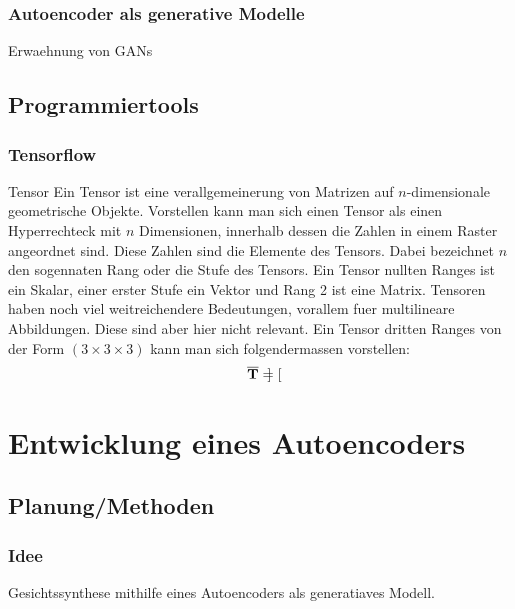 \subsection{Autoencoder als generative Modelle}
Erwaehnung von GANs

\section{Programmiertools}

\subsection{Tensorflow}
\begin{defbox}{Tensor}
  Ein Tensor ist eine verallgemeinerung von Matrizen auf
  $n$-dimensionale geometrische Objekte. Vorstellen kann man sich einen Tensor
  als einen Hyperrechteck mit $n$ Dimensionen, innerhalb dessen die Zahlen in
  einem Raster angeordnet sind. Diese Zahlen sind die Elemente des Tensors.
  Dabei bezeichnet $n$ den sogennaten Rang oder die Stufe des Tensors.
  Ein Tensor nullten Ranges ist ein Skalar, einer erster Stufe ein Vektor und
  Rang 2 ist eine Matrix.
  Tensoren haben noch viel weitreichendere Bedeutungen, vorallem fuer
  multilineare Abbildungen. Diese sind aber hier nicht relevant.
  \para{}
  Ein Tensor dritten Ranges von der Form $(3 \times 3 \times 3)$ kann man sich
  folgendermassen vorstellen:
  \begin{equation*}
    \overline{\mathbf{T}} = \begin{bmatrix}

    \end{bmatrix}
  \end{equation*}

\end{defbox}

\chapter{Entwicklung eines Autoencoders}

\section{Planung/Methoden}

\subsection{Idee}
Gesichtssynthese mithilfe eines Autoencoders als generatiaves Modell.

